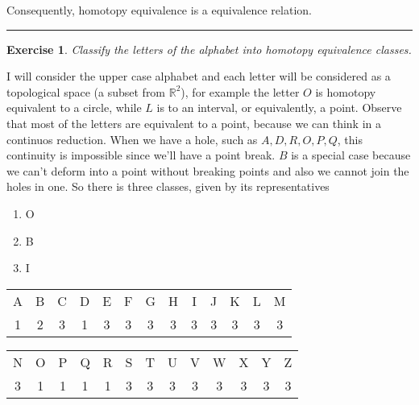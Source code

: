 \documentclass[a4paper,11pt]{article}
\newcommand{\linia}{\rule{\linewidth}{0.5pt}}
\theoremstyle{mytheor}
\theoremstyle{mytheor}
\newtheorem{exercise}{Exercise}
\theoremstyle{remark}
\newcommand{\R}{\mathbb{R}}
\begin{document}
Consequently, homotopy equivalence is a equivalence relation.

\noindent\linia

\begin{exercise}
    Classify the letters of the alphabet into homotopy equivalence classes.
\end{exercise}

I will consider the upper case alphabet and each letter will be considered as
a topological space (a subset from $\R^2$), for example the letter $O$ is
homotopy equivalent to a circle, while $L$ is to an interval, or equivalently,
a point. Observe that most of the letters are equivalent to a point, because
we can think in a continuos reduction. When we have a hole, such as $A, D, R, O,
P, Q$, this continuity is impossible since we'll have a point break. $B$ is a
special case because we can't deform into a point without breaking points and
also we cannot join the holes in one. So there is three classes, given by its
representatives

\begin{enumerate}
    \item O
    \item B
    \item I
\end{enumerate}

\begin{center}
    \begin{tabular}{c c c c c c c c c c c c c}
     A & B & C & D & E & F & G & H & I & J & K & L & M   \\ 
     1 & 2 & 3 & 1 & 3 & 3 & 3 & 3 & 3 & 3 & 3 & 3 & 3 
    \end{tabular}
    \end{center}

\begin{center}
    \begin{tabular}{c c c c c c c c c c c c c}
     N & O & P & Q & R & S & T & U & V & W & X & Y & Z  \\ 
     3 & 1 & 1 & 1 & 1 & 3 & 3 & 3 & 3 & 3 & 3 & 3 & 3     
    \end{tabular}
    \end{center}
\end{document}
